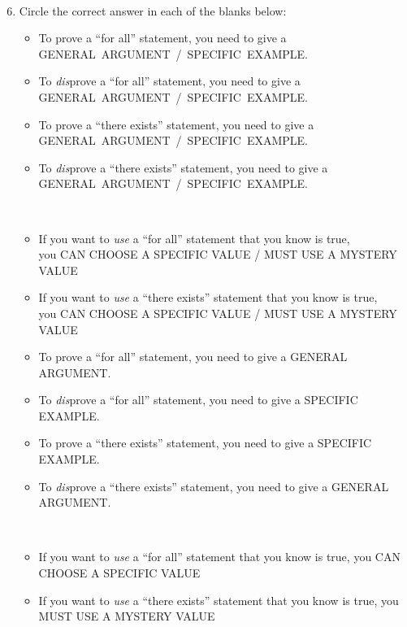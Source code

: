 \documentclass[12pt]{amsart}
\numberwithin{equation}{section}
\theoremstyle{plain} %
\theoremstyle{definition}
\theoremstyle{remark}
\begin{document}
\


\begin{enumerate}\setcounter{enumi}{5}



\item Circle the correct answer in each of the blanks below:
{\small
\begin{itemize}
\item To prove a ``for all'' statement, you need to give a\\ \mbox{GENERAL ARGUMENT / SPECIFIC EXAMPLE}.
\item To \emph{dis}prove a ``for all'' statement, you need to give a\\ \mbox{GENERAL ARGUMENT / SPECIFIC EXAMPLE}.
\item To prove a ``there exists'' statement, you need to give a\\ \mbox{GENERAL ARGUMENT / SPECIFIC EXAMPLE}.
\item To \emph{dis}prove a ``there exists'' statement, you need to give a\\ \mbox{GENERAL ARGUMENT / SPECIFIC EXAMPLE}.

\

\item If you want to  \emph{use} a ``for all'' statement that you know is true, \\you CAN CHOOSE A SPECIFIC VALUE / MUST USE A MYSTERY VALUE
\item If you want to  \emph{use} a ``there exists'' statement that you know is true, \\you CAN CHOOSE A SPECIFIC VALUE / MUST USE A MYSTERY VALUE

\end{itemize}
}

\begin{framed}
{\small
\begin{itemize}
\item To prove a ``for all'' statement, you need to give a GENERAL ARGUMENT.
\item To \emph{dis}prove a ``for all'' statement, you need to give a SPECIFIC EXAMPLE.
\item To prove a ``there exists'' statement, you need to give a SPECIFIC EXAMPLE.
\item To \emph{dis}prove a ``there exists'' statement, you need to give a GENERAL ARGUMENT.

\

\item If you want to  \emph{use} a ``for all'' statement that you know is true, you CAN CHOOSE A SPECIFIC VALUE
\item If you want to  \emph{use} a ``there exists'' statement that you know is true, you MUST USE A MYSTERY VALUE
\end{itemize}}
\end{framed}



\end{enumerate}
\end{document}
